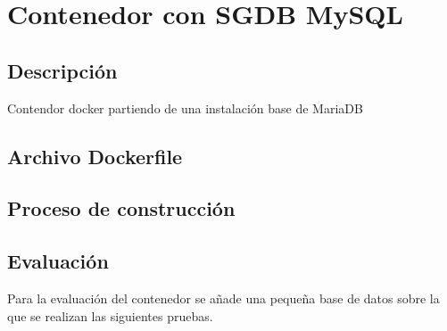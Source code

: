 \section{Contenedor con SGDB MySQL}

\subsection{Descripción}

Contendor docker partiendo de una instalación base de MariaDB

\subsection{Archivo Dockerfile}

\subsection{Proceso de construcción}




\subsection{Evaluación}

Para la evaluación del contenedor se añade una pequeña base de datos sobre la que se realizan las siguientes pruebas.


